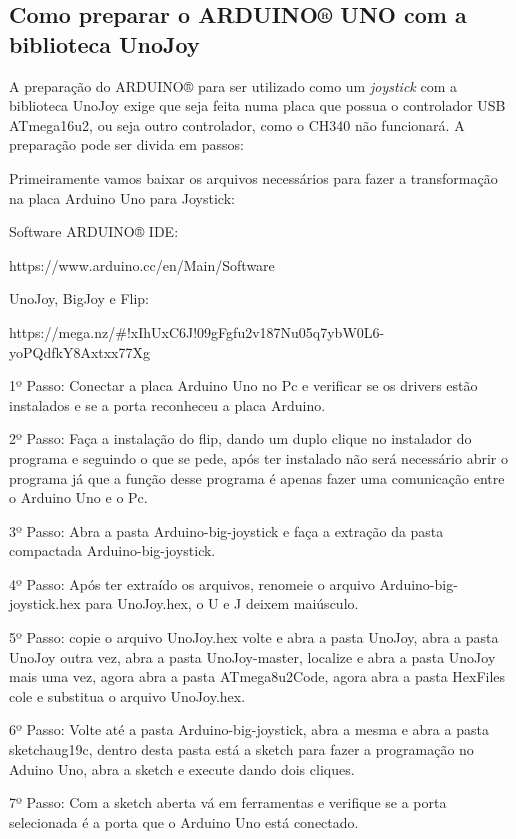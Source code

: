 \documentclass[
	12pt,			%
	openright,		%
	oneside,			%
	a4paper,			%
	chapter=TITLE,		%
	english,			%
	brazil,			%
	]{abntex2}
\begin{document}
\begin{anexosenv}

\partanexos

\chapter{Como preparar o ARDUINO® UNO com a biblioteca UnoJoy}

A preparação do ARDUINO® para ser utilizado como um \emph{joystick} com a biblioteca UnoJoy exige que seja feita numa placa que possua o controlador USB ATmega16u2, ou seja outro controlador, como o CH340 não funcionará. A preparação pode ser divida em passos:

Primeiramente vamos baixar os arquivos necessários para fazer a transformação na placa Arduino Uno para Joystick:
%
%

Software ARDUINO® IDE:

https://www.arduino.cc/en/Main/Software

UnoJoy, BigJoy e Flip:

https://mega.nz/\#!xIhUxC6J!09gFgfu2v187Nu05q7ybW0L6-yoPQdfkY8Axtxx77Xg


1º Passo: Conectar a placa Arduino Uno no Pc e verificar se os drivers estão instalados e se a porta reconheceu a placa Arduino. 

2º Passo: Faça a instalação do flip, dando um duplo clique no instalador do programa e seguindo o que se pede, após ter instalado não será necessário abrir o programa já que a função desse programa é apenas fazer uma comunicação entre o Arduino Uno e o Pc.

3º Passo: Abra a pasta Arduino-big-joystick e faça a extração da pasta compactada Arduino-big-joystick.

4º Passo: Após ter extraído os arquivos, renomeie o arquivo Arduino-big-joystick.hex para UnoJoy.hex, o U e J deixem maiúsculo.

5º Passo: copie o arquivo UnoJoy.hex volte e abra a pasta UnoJoy, abra a pasta UnoJoy outra vez, abra a pasta UnoJoy-master, localize e abra a pasta UnoJoy mais uma vez, agora abra a pasta ATmega8u2Code, agora abra a pasta HexFiles cole e substitua o arquivo UnoJoy.hex.

6º Passo: Volte até a pasta Arduino-big-joystick, abra a mesma e abra a pasta sketchaug19c, dentro desta pasta está a sketch  para fazer a programação no Aduino Uno, abra a sketch e execute dando dois cliques.

7º Passo: Com a sketch aberta vá em ferramentas e verifique se a porta selecionada é a porta que o Arduino Uno está conectado.



\end{anexosenv}


\printindex
\end{document}
